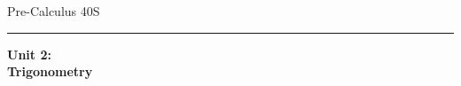 \documentclass[12pt,fleqn]{article}
\begin{document}
\setcounter{unit}{2}
\noindent
\thispagestyle{empty}
Pre-Calculus 40S
\medskip\hrule
\noindent

\vfill

\begin{center}
    {\bf \huge Unit 2:\\[1em] Trigonometry}
\end{center}

\vfill
\vfill

\cleardoublepage
 
\setcounter{page}{1}

\cleardoublepage
\end{document}
